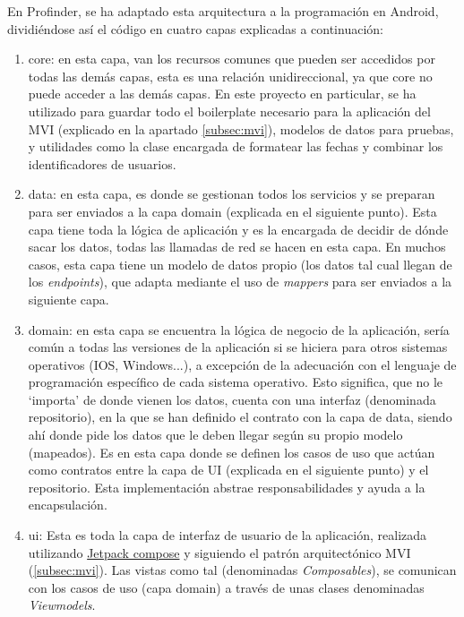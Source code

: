 En Profinder, se ha adaptado esta arquitectura a la programación en Android, dividiéndose así el código en cuatro capas explicadas a continuación:
\begin{enumerate}
    \item core: en esta capa, van los recursos comunes que pueden ser accedidos por todas las demás capas, esta es una relación unidireccional, ya que core no puede acceder a las demás capas. En este proyecto en particular, se ha utilizado para guardar todo el boilerplate necesario para la aplicación del MVI (explicado en la apartado \ref{subsec:mvi}), modelos de datos para pruebas, y utilidades como la clase encargada de formatear las fechas y combinar los identificadores de usuarios.
    \item data: en esta capa, es donde se gestionan todos los servicios y se preparan para ser enviados a la capa domain (explicada en el siguiente punto). Esta capa tiene toda la lógica de aplicación y es la encargada de decidir de dónde sacar los datos, todas las llamadas de red se hacen en esta capa. En muchos casos, esta capa tiene un modelo de datos propio (los datos tal cual llegan de los \textit{endpoints}), que adapta mediante el uso de \textit{mappers} para ser enviados a la siguiente capa.
    \item domain: en esta capa se encuentra la lógica de negocio de la aplicación, sería común a todas las versiones de la aplicación si se hiciera para otros sistemas operativos (IOS, Windows...), a excepción de la adecuación con el lenguaje de programación específico de cada sistema operativo. Esto significa, que no le ‘importa’ de donde vienen los datos, cuenta con una interfaz (denominada repositorio), en la que se han definido el contrato con la capa de data, siendo ahí donde pide los datos que le deben llegar según su propio modelo (mapeados). Es en esta capa donde se definen los casos de uso que actúan como contratos entre la capa de UI (explicada en el siguiente punto) y el repositorio. Esta implementación abstrae responsabilidades y ayuda a la encapsulación. 
    \item ui: Esta es toda la capa de interfaz de usuario de la aplicación, realizada utilizando \hyperlink{subsec:compose}{Jetpack compose} y siguiendo el patrón arquitectónico  MVI (\ref{subsec:mvi}). Las vistas como tal (denominadas \textit{Composables}), se comunican con los casos de uso (capa domain) a través de unas clases denominadas \textit{Viewmodels}\hyperlink{cap:biblio}{}.
\end{enumerate}

